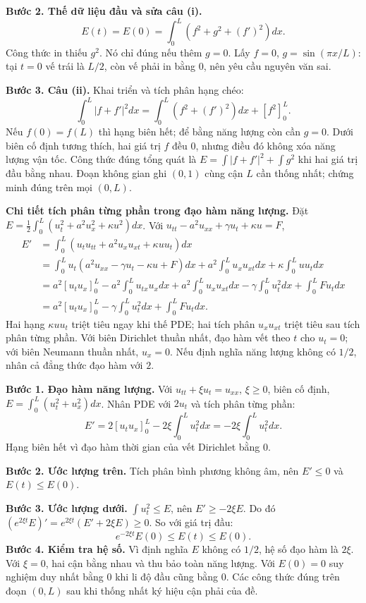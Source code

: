 \textbf{Bước 2. Thế dữ liệu đầu và sửa câu (i).}
\[E(t)=E(0)=\int_0^L(f^2+g^2+(f')^2)dx.\]
Công thức in thiếu $g^2$. Nó chỉ đúng nếu thêm $g=0$. Lấy $f=0$, $g=\sin(\pi x/L)$: tại $t=0$ vế trái là $L/2$, còn vế phải in bằng $0$, nên yêu cầu nguyên văn sai.

\textbf{Bước 3. Câu (ii).} Khai triển và tích phân hạng chéo:
\[\int_0^L|f+f'|^2dx=\int_0^L(f^2+(f')^2)dx+[f^2]_0^L.\]
Nếu $f(0)=f(L)$ thì hạng biên hết; để bằng năng lượng còn cần $g=0$. Dưới biên cố định tương thích, hai giá trị $f$ đều $0$, nhưng điều đó không xóa năng lượng vận tốc. Công thức đúng tổng quát là $E=\int|f+f'|^2+\int g^2$ khi hai giá trị đầu bằng nhau. Đoạn không gian ghi $(0,1)$ cùng cận $L$ cần thống nhất; chứng minh đúng trên mọi $(0,L)$.

\textbf{Chi tiết tích phân từng phần trong đạo hàm năng lượng.} Đặt $E=\frac12\int_0^L(u_t^2+a^2u_x^2+\kappa u^2)dx$. Với $u_{tt}-a^2u_{xx}+\gamma u_t+\kappa u=F$,
\[\begin{aligned}
E'&=\int_0^L(u_tu_{tt}+a^2u_xu_{xt}+\kappa uu_t)dx\\
&=\int_0^Lu_t(a^2u_{xx}-\gamma u_t-\kappa u+F)dx
+a^2\int_0^Lu_xu_{xt}dx+\kappa\int_0^Luu_tdx\\
&=a^2[u_tu_x]_0^L-a^2\int_0^Lu_{tx}u_xdx
+a^2\int_0^Lu_xu_{xt}dx-\gamma\int_0^Lu_t^2dx+\int_0^LFu_tdx\\
&=a^2[u_tu_x]_0^L-\gamma\int_0^Lu_t^2dx+\int_0^LFu_tdx.
\end{aligned}\]
Hai hạng $\kappa uu_t$ triệt tiêu ngay khi thế PDE; hai tích phân $u_xu_{xt}$ triệt tiêu sau tích phân từng phần. Với biên Dirichlet thuần nhất, đạo hàm vết theo $t$ cho $u_t=0$; với biên Neumann thuần nhất, $u_x=0$. Nếu định nghĩa năng lượng không có $1/2$, nhân cả đẳng thức đạo hàm với $2$.

\textbf{Bước 1. Đạo hàm năng lượng.} Với $u_{tt}+\xi u_t=u_{xx}$, $\xi\ge0$, biên cố định, $E=\int_0^L(u_t^2+u_x^2)dx$. Nhân PDE với $2u_t$ và tích phân từng phần:
\[E'=2[u_tu_x]_0^L-2\xi\int_0^Lu_t^2dx=-2\xi\int_0^Lu_t^2dx.\]
Hạng biên hết vì đạo hàm thời gian của vết Dirichlet bằng $0$.

\textbf{Bước 2. Ước lượng trên.} Tích phân bình phương không âm, nên $E'\le0$ và $E(t)\le E(0)$.

\textbf{Bước 3. Ước lượng dưới.} $\int u_t^2\le E$, nên $E'\ge-2\xi E$. Do đó $(e^{2\xi t}E)'=e^{2\xi t}(E'+2\xi E)\ge0$. So với giá trị đầu:
\[e^{-2\xi t}E(0)\le E(t)\le E(0).\]
\textbf{Bước 4. Kiểm tra hệ số.} Vì định nghĩa $E$ không có $1/2$, hệ số đạo hàm là $2\xi$. Với $\xi=0$, hai cận bằng nhau và thu bảo toàn năng lượng. Với $E(0)=0$ suy nghiệm duy nhất bằng $0$ khi li độ đầu cũng bằng $0$. Các công thức đúng trên đoạn $(0,L)$ sau khi thống nhất ký hiệu cận phải của đề.
